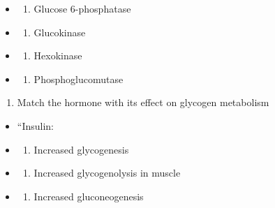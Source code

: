 \documentclass[
]{book}
\providecommand{\tightlist}{%
  \setlength{\itemsep}{0pt}\setlength{\parskip}{0pt}}
\begin{document}
\begin{itemize}
\tightlist
\item
  \begin{enumerate}
  \def\labelenumi{(\Alph{enumi})}
  \tightlist
  \item
    Glucose 6-phosphatase\\
  \end{enumerate}
\item
  \begin{enumerate}
  \def\labelenumi{(\Alph{enumi})}
  \setcounter{enumi}{1}
  \tightlist
  \item
    Glucokinase\\
  \end{enumerate}
\item
  \begin{enumerate}
  \def\labelenumi{(\Alph{enumi})}
  \setcounter{enumi}{2}
  \tightlist
  \item
    Hexokinase\\
  \end{enumerate}
\item
  \begin{enumerate}
  \def\labelenumi{(\Alph{enumi})}
  \setcounter{enumi}{3}
  \tightlist
  \item
    Phosphoglucomutase
  \end{enumerate}
\end{itemize}

\begin{enumerate}
\def\labelenumi{\arabic{enumi}.}
\setcounter{enumi}{1}
\tightlist
\item
  Match the hormone with its effect on glycogen metabolism
\end{enumerate}

\begin{itemize}
\item
  ``Insulin:
\item
  \begin{enumerate}
  \def\labelenumi{(\Alph{enumi})}
  \tightlist
  \item
    Increased glycogenesis\\
  \end{enumerate}
\item
  \begin{enumerate}
  \def\labelenumi{(\Alph{enumi})}
  \setcounter{enumi}{1}
  \tightlist
  \item
    Increased glycogenolysis in muscle\\
  \end{enumerate}
\item
  \begin{enumerate}
  \def\labelenumi{(\Alph{enumi})}
  \setcounter{enumi}{2}
  \tightlist
  \item
    Increased gluconeogenesis
  \end{enumerate}
\end{itemize}
\end{document}
